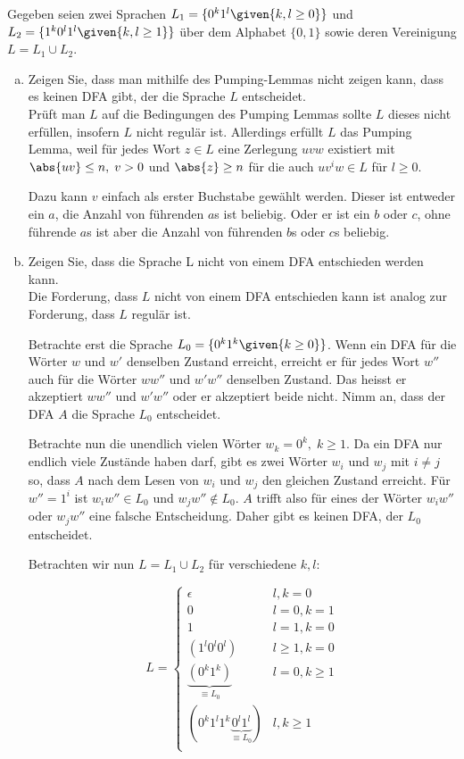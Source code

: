 Gegeben seien zwei Sprachen $L_1 = \{
0^{k}
 1^{l}
\given{k,l
\geq 0}\}$
und
$L_2 = \{1^k 0^l 1^l
\given{k,l \geq 1} \}$ über dem
 Alphabet $\{0, 1\}$
  sowie deren Vereinigung
  $L =
  L_1
  \cup
  L_2$.
\begin{enumerate}[a)]

\item Zeigen Sie, dass man mithilfe des Pumping-Lemmas nicht zeigen kann, dass es keinen DFA gibt, der die Sprache $L$ entscheidet.\\

Prüft man $L$ auf die Bedingungen des Pumping Lemmas sollte $L$ dieses nicht erfüllen, insofern $L$ nicht regulär ist. Allerdings erfüllt $L$ das Pumping Lemma, weil für jedes Wort $z \in L$ eine Zerlegung $uvw$ existiert mit $\abs{uv} \leq n, \; v>0$ und $\abs{z} \geq n$ für die auch $uv^iw \in L$ für $l \geq 0$.

Dazu kann $v$ einfach als erster Buchstabe gewählt werden. Dieser ist entweder ein $a$, die Anzahl von führenden $a$s ist beliebig. Oder er ist ein $b$ oder $c$, ohne führende $a$s ist aber die Anzahl von führenden $b$s oder $c$s beliebig.




\item Zeigen Sie, dass die Sprache L nicht von einem DFA entschieden werden kann.\\

Die Forderung, dass $L$ nicht von einem DFA entschieden kann ist analog zur Forderung, dass $L$ regulär ist.

Betrachte erst die Sprache $L_0 = \{  0^k 1^k \given{k \geq 0} \}$. Wenn ein DFA für die Wörter $w$ und $w'$ denselben Zustand erreicht, erreicht er für jedes Wort $w''$ auch für die Wörter $ww''$ und $w'w''$ denselben Zustand. Das heisst er akzeptiert $ww''$ und $w'w''$ oder er akzeptiert beide nicht. Nimm an, dass der DFA $A$ die Sprache $L_0$ entscheidet.

Betrachte nun die unendlich vielen Wörter $w_k = 0^k, \; k \geq 1$. Da ein DFA nur endlich viele Zustände haben darf, gibt es zwei Wörter $w_i$ und $w_j$ mit $i \neq j$ so, dass $A$ nach dem Lesen von $w_i$ und $w_j$ den gleichen Zustand erreicht. Für $w'' = 1^i$ ist $w_i w'' \in L_0$ und $w_j w'' \notin L_0$. $A$ trifft also für eines der Wörter $w_i w''$ oder $w_j w''$ eine falsche Entscheidung. Daher gibt es keinen DFA, der $L_0$ entscheidet.

Betrachten wir nun $L = L_1 \cup L_2$ für verschiedene $k, l$:

\[ L=
\begin{cases}
     \epsilon & l,k = 0 \\
            0 & l = 0, k=1 \\
            1 & l = 1, k=0 \\
(1^l 0^l 0^l) & l \geq 1, k=0 \\
    \underbrace{(0^k 1^k)}_{\equiv L_0} & l=0, k \geq 1 \\
(0^k 1^l 1^k \underbrace{0^l 1^l}_{\equiv L_0})  & l,k \geq 1 \\
\end{cases}
\]


\end{enumerate}

